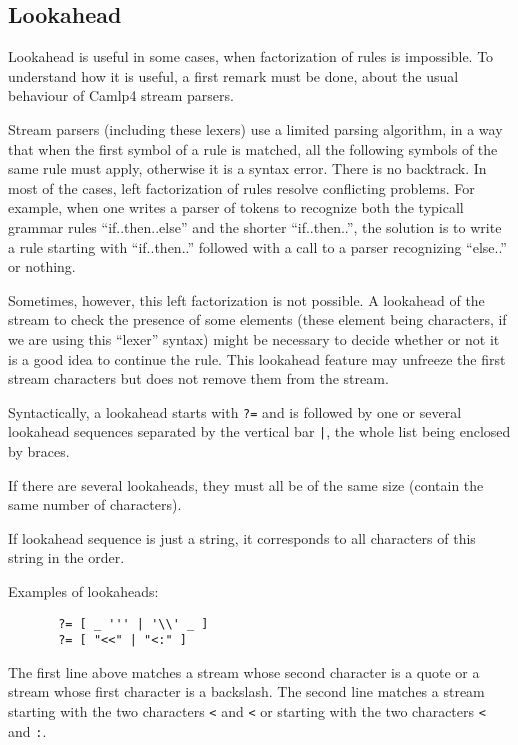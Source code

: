 \documentclass[11pt]{article}
\begin{document}
\subsection{Lookahead}
\label{lookahead}

Lookahead is useful in some cases, when factorization of rules is
impossible. To understand how it is useful, a first remark must
be done, about the usual behaviour of Camlp4 stream parsers.

Stream parsers (including these lexers) use a limited parsing
algorithm, in a way that when the first symbol of a rule is matched,
all the following symbols of the same rule must apply, otherwise it is
a syntax error. There is no backtrack. In most of the cases, left
factorization of rules resolve conflicting problems. For example, when
one writes a parser of tokens to recognize both the typicall grammar
rules ``if..then..else'' and the shorter ``if..then..'', the solution
is to write a rule starting with ``if..then..'' followed with a call
to a parser recognizing ``else..'' or nothing.

Sometimes, however, this left factorization is not possible. A
lookahead of the stream to check the presence of some elements (these
element being characters, if we are using this ``lexer'' syntax) might
be necessary to decide whether or not it is a good idea to continue
the rule. This lookahead feature may unfreeze the first stream
characters but does not remove them from the stream.

Syntactically, a lookahead starts with \verb/?=/ and is followed by
one or several lookahead sequences separated by the vertical bar
\verb/|/, the whole list being enclosed by braces.

If there are several lookaheads, they must all be of the same size
(contain the same number of characters).

If lookahead sequence is just a string, it corresponds to all characters
of this string in the order.

Examples of lookaheads:

\begin{verbatim}
       ?= [ _ ''' | '\\' _ ]
       ?= [ "<<" | "<:" ]
\end{verbatim}

The first line above matches a stream whose second character is a
quote or a stream whose first character is a backslash.  The second
line matches a stream starting with the two characters \verb/</ and
\verb/</ or starting with the two characters \verb/</ and \verb/:/.
\end{document}
